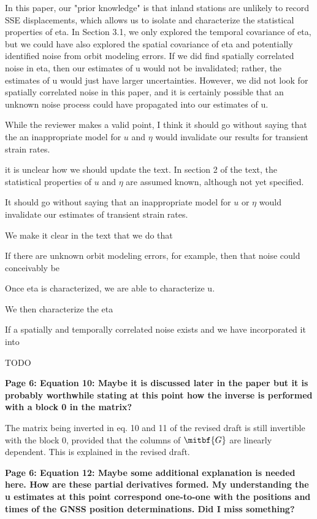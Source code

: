 \documentclass[10pt,a4paper]{letter}
\begin{document}
\begin{letter}{}
In this paper, our "prior knowledge" is that inland stations are
unlikely to record SSE displacements, which allows us to isolate and
characterize the statistical properties of eta. In Section 3.1, we
only explored the temporal covariance of eta, but we could have also
explored the spatial covariance of eta and potentially identified
noise from orbit modeling errors. If we did find spatially correlated
noise in eta, then our estimates of u would not be invalidated;
rather, the estimates of u would just have larger uncertainties.
However, we did not look for spatially correlated noise in this paper,
and it is certainly possible that an unknown noise process could have
propagated into our estimates of u.

While the reviewer makes a valid point, I think it should go without
saying that the an inappropriate model for $u$ and $\eta$ would
invalidate our results for transient strain rates.

it is unclear how we should
update the text. In section 2 of the text, the statistical properties
of $u$ and $\eta$ are assumed known, although not yet specified. 

It
should go without saying that an inappropriate model for $u$ or $\eta$
would invalidate our estimates of transient strain rates.


 We make it clear in the text that we do that 

If there are unknown orbit modeling errors, for example, then that noise could conceivably be 


Once eta is
characterized, we are able to characterize u.


 We then characterize the eta


If a spatially and temporally correlated noise exists and we have incorporated it into 

TODO

\textbf{Page 6: Equation 10: Maybe it is discussed later in the paper but it
is probably worthwhile stating at this point how the inverse is
performed with a block 0 in the matrix?}

The matrix being inverted in eq. 10 and 11 of the revised draft is
still invertible with the block 0, provided that the columns of
$\mitbf{G}$ are linearly dependent. This is explained in the revised
draft.

\textbf{Page 6: Equation 12: Maybe some additional explanation is needed here.
How are these partial derivatives formed.  My understanding the u
estimates at this point correspond one-to-one with the positions and
times of the GNSS position determinations.  Did I miss something?}


\end{letter}
\end{document}

